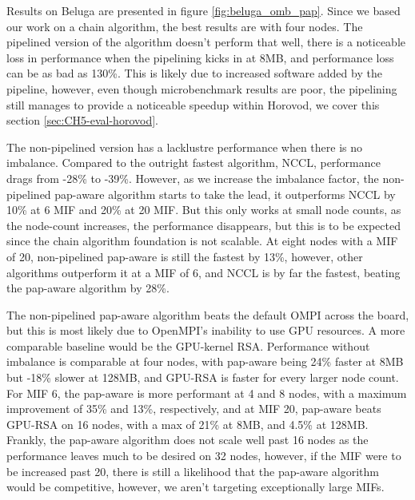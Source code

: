 


Results on Beluga are presented in figure \ref{fig:beluga_omb_pap}.
Since we based our work on a chain algorithm, the best results are with four nodes.
The pipelined version of the algorithm doesn't perform that well, there is a noticeable loss in performance when the pipelining kicks in at 8MB, and performance loss can be as bad as 130\%.
This is likely due to increased software added by the pipeline, however, even though microbenchmark results are poor, the pipelining still manages to provide a noticeable speedup within Horovod, we cover this section \ref{sec:CH5-eval-horovod}.

The non-pipelined version has a lacklustre performance when there is no imbalance.
Compared to the outright fastest algorithm, NCCL, performance drags from -28\% to -39\%.
However, as we increase the imbalance factor, the non-pipelined pap-aware algorithm starts to take the lead, it outperforms NCCL by 10\% at 6 MIF and 20\% at 20 MIF.
But this only works at small node counts, as the node-count increases, the performance disappears, but this is to be expected since the chain algorithm foundation is not scalable.
At eight nodes with a MIF of 20, non-pipelined pap-aware is still the fastest by 13\%, however, other algorithms outperform it at a MIF of 6, and NCCL is by far the fastest, beating the pap-aware algorithm by 28\%.

The non-pipelined pap-aware algorithm beats the default OMPI across the board, but this is most likely due to OpenMPI's inability to use GPU resources.
A more comparable baseline would be the GPU-kernel RSA.
Performance without imbalance is comparable at four nodes, with pap-aware being 24\% faster at 8MB but -18\% slower at 128MB, and GPU-RSA is faster for every larger node count.
For MIF 6, the pap-aware is more performant at 4 and 8 nodes, with a maximum improvement of 35\% and 13\%, respectively, and at MIF 20, pap-aware beats GPU-RSA on 16 nodes, with a max of 21\% at 8MB, and 4.5\% at 128MB.
Frankly, the pap-aware algorithm does not scale well past 16 nodes as the performance leaves much to be desired  on 32 nodes, however, if the MIF were to be increased past 20, there is still a likelihood that the pap-aware algorithm would be competitive, however, we aren't targeting exceptionally large MIFs. 



